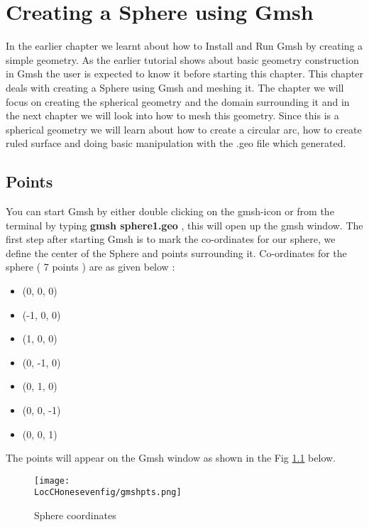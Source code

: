 \chapter{Creating a Sphere using Gmsh}
\thispagestyle{empty}
\label{sec:chap17}
\newcommand{\LocCHonesevenfig}{\Origin/CHAPTERS/chap17/figures}

In the earlier chapter we learnt about how to Install and Run Gmsh by creating a simple geometry. As the earlier tutorial shows about basic geometry construction in Gmsh the user is expected to know it before starting this chapter. This chapter deals with creating a Sphere using Gmsh and meshing it. The chapter we will focus on creating the spherical geometry and the domain surrounding it and in the next chapter we will look into how to mesh this geometry. Since this is a spherical geometry we will learn about how to create a circular arc, how to create ruled surface and doing basic manipulation with the .geo file which generated. 

\section{Points}

You can start Gmsh by either double clicking on the gmsh-icon or from the terminal by typing \textbf{gmsh sphere1.geo} , this will open up the gmsh window. The first step after starting Gmsh is to mark the co-ordinates for our sphere, we define the center of the Sphere and points surrounding it. Co-ordinates for the sphere ( 7 points ) are as given below : \newline

\begin{itemize}

\item (0, 0, 0)
\item (-1, 0, 0)
\item (1, 0, 0)
\item (0, -1, 0)
\item (0, 1, 0)
\item (0, 0, -1)
\item (0, 0, 1)

\end{itemize}

\flushleft The points will appear on the Gmsh window as shown in the Fig \ref{points} below.

\begin{figure}[h]  
\centering
\texttt{[image: \\LocCHonesevenfig/gmshpts.png]}
\caption{Sphere coordinates}
\label{points}
\end{figure}

